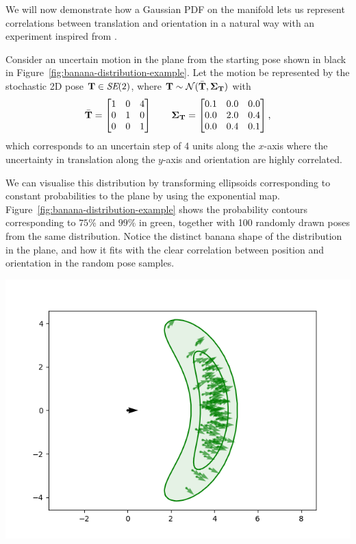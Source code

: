 \begin{example}[frametitle=The banana distribution is Gaussian]
We will now demonstrate how a Gaussian PDF on the manifold lets us represent correlations between translation and orientation in a natural way with an experiment inspired from \cite{Long2012TheCoordinates}.

Consider an uncertain motion in the plane from the starting pose shown in black in Figure~\ref{fig:banana-distribution-example}.
Let the motion be represented by the stochastic 2D pose ${\boldsymbol{\mathbf{T}}} \in \textit{SE}(2)$, where ${\boldsymbol{\mathbf{T}}} \sim \mathcal{N}(\bar{{\boldsymbol{\mathbf{T}}}}, {\boldsymbol{\mathbf{\Sigma}}}_{\boldsymbol{\mathbf{T}}})$ with
\begin{equation*}
  \bar{{\boldsymbol{\mathbf{T}}}} =
  \begin{bmatrix}
    1 & 0 & 4 \\
    0 & 1 & 0 \\
    0 & 0 & 1
  \end{bmatrix}
  \qquad
  {\boldsymbol{\mathbf{\Sigma}}}_{\boldsymbol{\mathbf{T}}} =
  \begin{bmatrix}
    0.1 & 0.0 & 0.0 \\
    0.0 & 2.0 & 0.4 \\
    0.0 & 0.4 & 0.1
  \end{bmatrix},
\end{equation*}
which corresponds to an uncertain step of 4 units along the $x$-axis where the uncertainty in translation along the $y$-axis and orientation are highly correlated.

We can visualise this distribution by transforming ellipsoids corresponding to constant probabilities to the plane by using the exponential map.
Figure~\ref{fig:banana-distribution-example} shows the probability contours corresponding to $75\%$ and $99\%$ in green, together with 100 randomly drawn poses from the same distribution.
Notice the distinct banana shape of the distribution in the plane, and how it fits with the clear correlation between position and orientation in the random pose samples.

{
  \centering
  \includegraphics[width=0.75\columnwidth]{figures/banana-distribution.png}
  \captionsetup{type=figure}
  \label{fig:banana-distribution-example}
  \par
}
\end{example}

